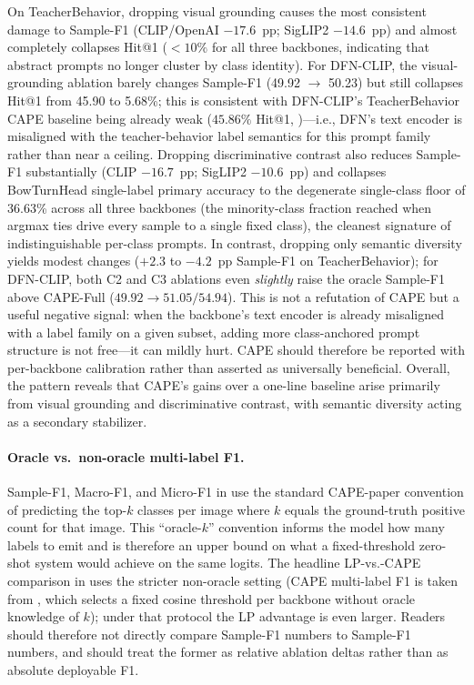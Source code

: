 \documentclass[symmetry,article,submit,pdftex,moreauthors]{Definitions/mdpi}
\begin{document}
On TeacherBehavior, dropping visual grounding causes the most consistent damage to Sample-F1 (CLIP/OpenAI $-17.6$~pp; SigLIP2 $-14.6$~pp) and almost completely collapses Hit@1 ($<10\%$ for all three backbones, indicating that abstract prompts no longer cluster by class identity). For DFN-CLIP, the visual-grounding ablation barely changes Sample-F1 (49.92 $\to$ 50.23) but still collapses Hit@1 from 45.90 to 5.68\%; this is consistent with DFN-CLIP's TeacherBehavior CAPE baseline being already weak ($45.86\%$ Hit@1, )---i.e., DFN's text encoder is misaligned with the teacher-behavior label semantics for this prompt family rather than near a ceiling. Dropping discriminative contrast also reduces Sample-F1 substantially (CLIP $-16.7$~pp; SigLIP2 $-10.6$~pp) and collapses BowTurnHead single-label primary accuracy to the degenerate single-class floor of 36.63\% across all three backbones (the minority-class fraction reached when argmax ties drive every sample to a single fixed class), the cleanest signature of indistinguishable per-class prompts. In contrast, dropping only semantic diversity yields modest changes ($+2.3$ to $-4.2$~pp Sample-F1 on TeacherBehavior); for DFN-CLIP, both \textsc{C2} and \textsc{C3} ablations even \emph{slightly} raise the oracle Sample-F1 above CAPE-Full ($49.92 \to 51.05 / 54.94$). This is not a refutation of CAPE but a useful negative signal: when the backbone's text encoder is already misaligned with a label family on a given subset, adding more class-anchored prompt structure is not free---it can mildly hurt. CAPE should therefore be reported with per-backbone calibration rather than asserted as universally beneficial. Overall, the pattern reveals that CAPE's gains over a one-line baseline arise primarily from visual grounding and discriminative contrast, with semantic diversity acting as a secondary stabilizer.

\paragraph{Oracle vs.\ non-oracle multi-label F1.} Sample-F1, Macro-F1, and Micro-F1 in  use the standard CAPE-paper convention of predicting the top-$k$ classes per image where $k$ equals the ground-truth positive count for that image. This ``oracle-$k$'' convention informs the model how many labels to emit and is therefore an upper bound on what a fixed-threshold zero-shot system would achieve on the same logits. The headline LP-vs.-CAPE comparison in  uses the stricter non-oracle setting (CAPE multi-label F1 is taken from , which selects a fixed cosine threshold per backbone without oracle knowledge of $k$); under that protocol the LP advantage is even larger. Readers should therefore not directly compare  Sample-F1 numbers to  Sample-F1 numbers, and should treat the former as relative ablation deltas rather than as absolute deployable F1.
\end{document}
